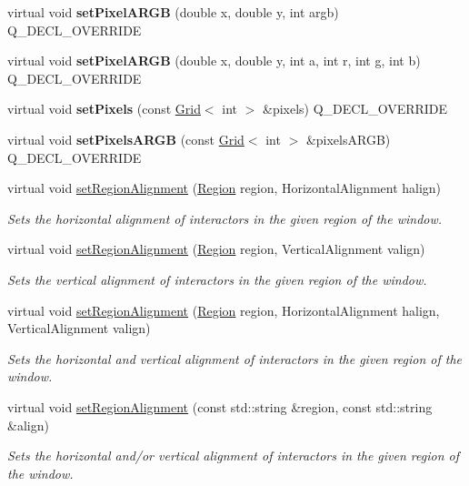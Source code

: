 \begin{DoxyCompactItemize}
\item 
virtual void {\bfseries set\+Pixel\+A\+R\+GB} (double x, double y, int argb) Q\+\_\+\+D\+E\+C\+L\+\_\+\+O\+V\+E\+R\+R\+I\+DE
\item 
virtual void {\bfseries set\+Pixel\+A\+R\+GB} (double x, double y, int a, int r, int g, int b) Q\+\_\+\+D\+E\+C\+L\+\_\+\+O\+V\+E\+R\+R\+I\+DE
\item 
virtual void {\bfseries set\+Pixels} (const \mbox{\hyperlink{classGrid}{Grid}}$<$ int $>$ \&pixels) Q\+\_\+\+D\+E\+C\+L\+\_\+\+O\+V\+E\+R\+R\+I\+DE
\item 
virtual void {\bfseries set\+Pixels\+A\+R\+GB} (const \mbox{\hyperlink{classGrid}{Grid}}$<$ int $>$ \&pixels\+A\+R\+GB) Q\+\_\+\+D\+E\+C\+L\+\_\+\+O\+V\+E\+R\+R\+I\+DE
\item 
virtual void \mbox{\hyperlink{classGWindow_a96e9f5593c0193bbdc7ae99945b9cf5f}{set\+Region\+Alignment}} (\mbox{\hyperlink{classGWindow_a81a01a86de31071a92e6cce0bab9bc4b}{Region}} region, Horizontal\+Alignment halign)
\begin{DoxyCompactList}\small\item\em Sets the horizontal alignment of interactors in the given region of the window. \end{DoxyCompactList}\item 
virtual void \mbox{\hyperlink{classGWindow_a926942899d029fc9921fe770ac2867bb}{set\+Region\+Alignment}} (\mbox{\hyperlink{classGWindow_a81a01a86de31071a92e6cce0bab9bc4b}{Region}} region, Vertical\+Alignment valign)
\begin{DoxyCompactList}\small\item\em Sets the vertical alignment of interactors in the given region of the window. \end{DoxyCompactList}\item 
virtual void \mbox{\hyperlink{classGWindow_ab4d2bfcca7a18da2847e7b4494da4a16}{set\+Region\+Alignment}} (\mbox{\hyperlink{classGWindow_a81a01a86de31071a92e6cce0bab9bc4b}{Region}} region, Horizontal\+Alignment halign, Vertical\+Alignment valign)
\begin{DoxyCompactList}\small\item\em Sets the horizontal and vertical alignment of interactors in the given region of the window. \end{DoxyCompactList}\item 
virtual void \mbox{\hyperlink{classGWindow_ae4ff46516be9472498c0bf058b496e8b}{set\+Region\+Alignment}} (const std\+::string \&region, const std\+::string \&align)
\begin{DoxyCompactList}\small\item\em Sets the horizontal and/or vertical alignment of interactors in the given region of the window. \end{DoxyCompactList}\item 

\end{DoxyCompactItemize}

